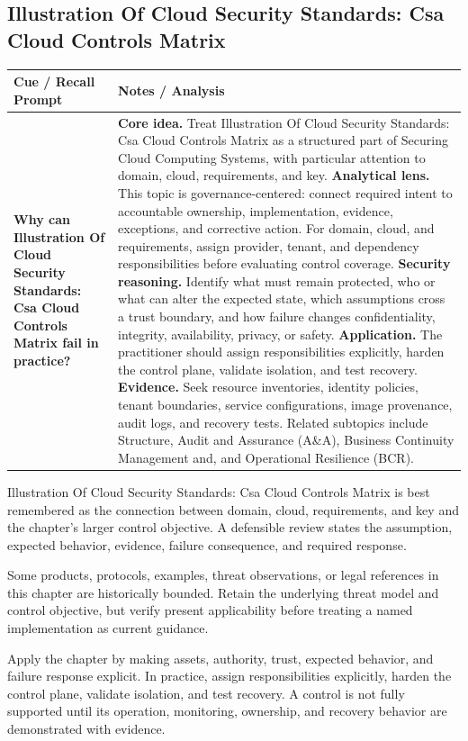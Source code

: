 \documentclass[11pt]{article}
\newcommand{\CornellHeader}{%
\rowcolor{Navy}\color{white}\bfseries Cue / Recall Prompt & \color{white}\bfseries Notes / Analysis\\\hline}
\newcommand{\CornellRow}[2]{%
\cellcolor{CueGray}\RaggedRight\textbf{#1} & \RaggedRight #2\\\hline}
\begin{document}
\subsection*{Illustration Of Cloud Security Standards: Csa Cloud Controls Matrix}
\begin{longtable}{>{\RaggedRight\arraybackslash}p{}|>{\RaggedRight\arraybackslash}p{}}
\CornellHeader
\CornellRow{Why can Illustration Of Cloud Security Standards: Csa Cloud Controls Matrix fail in practice?}{\textbf{Core idea.} Treat Illustration Of Cloud Security Standards: Csa Cloud Controls Matrix as a structured part of Securing Cloud Computing Systems, with particular attention to domain, cloud, requirements, and key. \textbf{Analytical lens.} This topic is governance-centered: connect required intent to accountable ownership, implementation, evidence, exceptions, and corrective action. For domain, cloud, and requirements, assign provider, tenant, and dependency responsibilities before evaluating control coverage. \textbf{Security reasoning.} Identify what must remain protected, who or what can alter the expected state, which assumptions cross a trust boundary, and how failure changes confidentiality, integrity, availability, privacy, or safety. \textbf{Application.} The practitioner should assign responsibilities explicitly, harden the control plane, validate isolation, and test recovery. \textbf{Evidence.} Seek resource inventories, identity policies, tenant boundaries, service configurations, image provenance, audit logs, and recovery tests. Related subtopics include Structure, Audit and Assurance (A\&A), Business Continuity Management and, and Operational Resilience (BCR).}
\end{longtable}
\begin{topicsummary}
Illustration Of Cloud Security Standards: Csa Cloud Controls Matrix is best remembered as the connection between domain, cloud, requirements, and key and the chapter's larger control objective. A defensible review states the assumption, expected behavior, evidence, failure consequence, and required response.
\end{topicsummary}
\begin{historybox}
Some products, protocols, examples, threat observations, or legal references in this chapter are historically bounded. Retain the underlying threat model and control objective, but verify present applicability before treating a named implementation as current guidance.
\end{historybox}
\begin{defensebox}
Apply the chapter by making assets, authority, trust, expected behavior, and failure response explicit. In practice, assign responsibilities explicitly, harden the control plane, validate isolation, and test recovery. A control is not fully supported until its operation, monitoring, ownership, and recovery behavior are demonstrated with evidence.
\end{defensebox}
\end{document}
